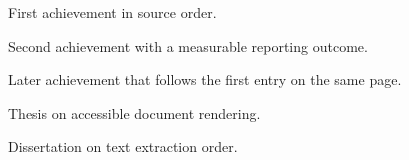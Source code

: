 \documentclass{careerdossier-resume}
\begin{document}
\MakeCDossierHeader
{}
\begin{CDossierEntry}[
  title        = {Senior Engineer},
  organization = {Example Labs},
  location     = {Toronto, ON},
  dates        = {2024--Present}
]
  \begin{CDossierItemize}
    \item First achievement in source order.
    \item Second achievement with a measurable reporting outcome.
  \end{CDossierItemize}
\end{CDossierEntry}
\begin{CDossierEntry}[
  title        = {Engineer},
  organization = {Example Services},
  location     = {Ottawa, ON},
  dates        = {2022--2024}
]
  \begin{CDossierItemize}
    \item Later achievement that follows the first entry on the same page.
  \end{CDossierItemize}
\end{CDossierEntry}
\begin{CDossierEntry}[
  title        = {PhD, Physics},
  organization = {Example University},
  location     = {Toronto, ON},
  dates        = {2012--2016}
]
  \begin{CDossierItemize}
    \item Thesis on accessible document rendering.
  \end{CDossierItemize}
\end{CDossierEntry}
\begin{CDossierEntry}[
  title        = {MSc, Physics},
  organization = {Example Institute},
  location     = {Ottawa, ON},
  dates        = {2010--2012}
]
  \begin{CDossierItemize}
    \item Dissertation on text extraction order.
  \end{CDossierItemize}
\end{CDossierEntry}
\end{document}
